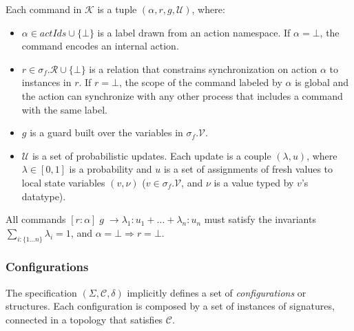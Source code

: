 \documentclass[10pt,journal,compsoc]{IEEEtran}
\begin{document}
Each command in $\mathcal{K}$ is a tuple $(\alpha, r, g, \mathcal{U})$, where:
\begin{itemize} 
	\setlength{\itemsep}{1pt}
	\setlength{\parskip}{0pt}
	\setlength{\parsep}{0pt}

  \item $\alpha \in actIds \cup \{\bot\}$ is a label drawn from an action namespace. If $\alpha=\bot$, the command encodes an internal action.
  \item $r \in \sigma_f.\mathcal{R} \cup \{\bot\}$ is a relation that constrains synchronization on action $\alpha$ to instances in $r$. If $r=\bot$, the scope of the command labeled by $\alpha$ is global and the action can synchronize with any other process that includes a command with the same label.
  \item $g$ is a guard built over the variables in $\sigma_f.\mathcal{V}$.
  \item $\mathcal{U}$ is a set of probabilistic updates. Each update is a couple $(\lambda, u)$, where $\lambda \in [0,1]$ is a probability and $u$ is a set of assignments of fresh values to local state variables $(v,\nu)$ ($v \in \sigma_f.\mathcal{V}$, and $\nu$ is a value typed by $v$'s datatype).
\end{itemize}

All commands $[r:\alpha]\; g \; \rightarrow \lambda_1 : u_1 + \ldots + \lambda_n : u_n$ must satisfy the invariants $\sum_{i:\{1\dots n\}} \lambda_i=1$, and $\alpha=\bot \Rightarrow r=\bot$.


\subsubsection{Configurations}
The specification $(\Sigma, \mathcal{C}, \delta)$ implicitly defines a set of {\em configurations} or structures. 
Each configuration is composed by a set of instances of signatures, connected in a topology that satisfies $\mathcal{C}$.
\end{document}
